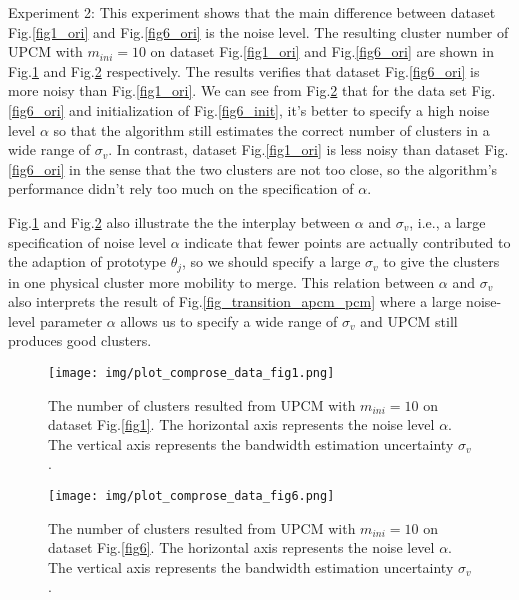 \documentclass[journal]{IEEEtran}
\theoremstyle{definition}
\begin{document}
Experiment 2: This experiment shows that the main difference between dataset Fig.\ref{fig1_ori} and Fig.\ref{fig6_ori} is the noise level. 
The resulting cluster number of UPCM with $m_{ini}=10$ on dataset Fig.\ref{fig1_ori} and Fig.\ref{fig6_ori} are shown in Fig.\ref{fig1_comprose} and Fig.\ref{fig6_comprose} respectively. The results verifies that dataset Fig.\ref{fig6_ori} is more noisy than Fig.\ref{fig1_ori}. 
We can see from Fig.\ref{fig6_comprose} that for the data set Fig.\ref{fig6_ori} and initialization of Fig.\ref{fig6_init}, it's better to specify a high noise level $\alpha$ so that the algorithm still estimates the correct number of clusters in a wide range of $\sigma_v$. In contrast, dataset Fig.\ref{fig1_ori} is less noisy than dataset Fig.\ref{fig6_ori} in the sense that the two clusters are not too close, so the algorithm's performance didn't rely too much on the specification of $\alpha$.

Fig.\ref{fig1_comprose} and Fig.\ref{fig6_comprose} also illustrate the the interplay between $\alpha$ and $\sigma_v$, i.e., a large specification of noise level $\alpha$ indicate that fewer points are actually contributed to the adaption of prototype $\theta_j$, so we should specify a large $\sigma_v$ to give the clusters in one physical cluster more mobility to merge. This relation between $\alpha$ and $\sigma_v$ also interprets the result of 
Fig.\ref{fig_transition_apcm_pcm} where a large noise-level parameter $\alpha$ allows us to specify a wide range of $\sigma_v$ and UPCM still produces good clusters.
\begin{figure}[htb]
\centering
\texttt{[image: img/plot\_comprose\_data\_fig1.png]}
\caption{\label{fig1_comprose}The number of clusters resulted from UPCM with $m_{ini}=10$ on dataset Fig.\ref{fig1}. The horizontal axis represents the noise level $\alpha$. The vertical axis represents the bandwidth estimation uncertainty $\sigma_v$.}
\end{figure}
\begin{figure}[htb]
\centering
\texttt{[image: img/plot\_comprose\_data\_fig6.png]}
\caption{\label{fig6_comprose}The number of clusters resulted from UPCM with $m_{ini}=10$ on dataset Fig.\ref{fig6}. The horizontal axis represents the noise level $\alpha$. The vertical axis represents the bandwidth estimation uncertainty $\sigma_v$.}
\end{figure}
\end{document}
